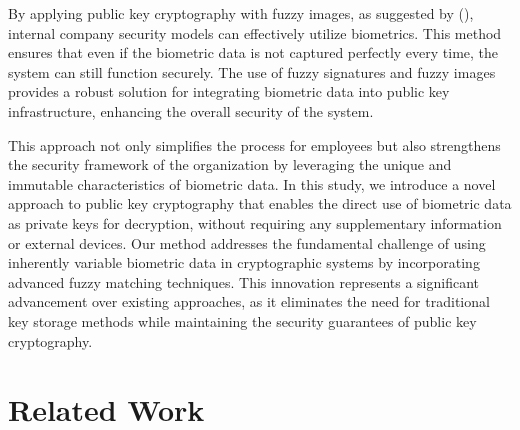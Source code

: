 \documentclass[graybox]{svmult}
\begin{document}
By applying public key cryptography with fuzzy images, as suggested by
\citeauthor{Son2016} (\citeyear{Son2016}), internal company security models can
effectively utilize biometrics. This method ensures that even if the biometric data is not
captured perfectly every time, the system can still function securely. The use of fuzzy
signatures and fuzzy images provides a robust solution for integrating biometric data into
public key infrastructure, enhancing the overall security of the system.

This approach not only simplifies the process for employees but also strengthens the security
framework of the organization by leveraging the unique and immutable characteristics of
biometric data. In this study, we introduce a novel approach to public key cryptography that enables the direct
use of biometric data as private keys for decryption, without requiring any supplementary information
or external devices. Our method addresses the fundamental challenge of using inherently variable
biometric data in cryptographic systems by incorporating advanced fuzzy matching techniques. This
innovation represents a significant advancement over existing approaches, as it eliminates the need for traditional 
key storage methods while maintaining the security guarantees of public key cryptography.

\section{Related Work}
\end{document}
